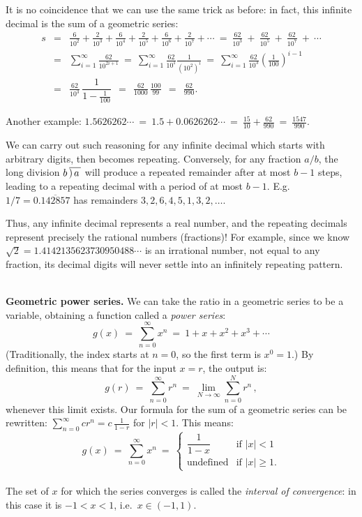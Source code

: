 \documentclass[11pt]{article}
\newcommand{\ds}{\displaystyle}
\begin{document}
It is no coincidence that we can use the same trick as before: in fact, this infinite decimal is the sum of a geometric series:
$$\begin{array}{rcl}
s &=& \frac{6}{10^2} + \frac{2}{10^3} + \frac{6}{10^4} + \frac{2}{10^5} 
 + \frac{6}{10^6} + \frac{2}{10^7} +\cdots
\ =\  \frac{62}{10^3} \ +\ \frac{62}{10^5} \ +\  \frac{62}{10^7}\ +\ \cdots
\\[1em]
&=&\ds
\sum\limits_{i=1}^\infty \frac{62}{10^{2i+1}}
\ =\
\sum\limits_{i=1}^\infty \frac{62}{10^1}\frac{1}{(10^2)^i}
\ =\
\sum\limits_{i=1}^\infty \frac{62}{10^3}\left(\!\frac1{100}\!\right)^{\!\!i-1}
\\[1.8em]
&=&\ds
\frac{62}{10^3}\,\dfrac{1}{1-\frac{1}{100}}
\ \ =\ \
\frac{62}{1000}\,\frac{100}{99}
\ \ =\ \
\frac{62}{990}.
\end{array}$$

\noindent
Another example:
$
1.5626262\cdots \ =\ 1.5 + 0.0626262\cdots 
\ =\ \frac{15}{10} +\frac{62}{990} \ =\ \frac{1547}{990}.
$
\\[.6em]
{\small
We can carry out such reasoning for any infinite decimal which starts with arbitrary digits,
then becomes repeating. Conversely, for any fraction $a/b$, the long division 
$b\,)\hspace{-.35em}\overline{\ \, \vphantom{A}a\,}$
will produce a repeated remainder after at most $b{-}1$ steps, 
leading to a repeating decimal with a period of at most $b{-}1$.
E.g.~$1/7 = 0.\overline{142857}$ has remainders $3,2,6,4,5,1,3,2, \ldots.$

Thus, any infinite decimal represents a real number, and the repeating decimals represent 
precisely the rational numbers (fractions)!
For example, since we know $\sqrt 2 = 1.4142135623730950488\cdots$ is an irrational number, not equal to any fraction, its decimal digits will never settle into an infinitely repeating pattern.
}
\\[1em]
{\bf Geometric power series.} We can take the ratio in a geometric series to be a variable, obtaining a function called a {\it power series}:
$$
g(x)\ =\ \sum_{n=0}^\infty x^n \ =\ 1 + x+ x^2 + x^3+\cdots
$$
(Traditionally, the index starts at $n=0$, so the first term is $x^0=1$.)
By definition, this means that for the input $x=r$, the output is:
$$
g(r) 
\ =\
\sum_{n=0}^\infty r^n
\ =\ 
\lim_{N\to\infty} \sum_{n=0}^N r^n\,,
$$
whenever this limit exists.
Our formula for the sum of a geometric series can be 
rewritten: {$\sum\limits_{n=0}^\infty cr^n = c\,\frac{1}{1-r}$} for $|r|<1$.
This means:
\\[-.4em]
$$\boxed{\quad
g(x) \ =\ \sum_{n=0}^\infty x^n
\ =\ \left\{\begin{array}{cl}
\dfrac1{1-x} & \text{if $|x|<1$}
\\[1em]
\text{undefined} &\text{if $|x|\geq1$}.
\end{array}\right.
\quad}$$
\\[-.2em]
The set of $x$ for which the series converges is called the {\it interval of convergence}:
in this case it is $-1<x<1$, i.e.~$x\in(-1,1)$.
\end{document}
